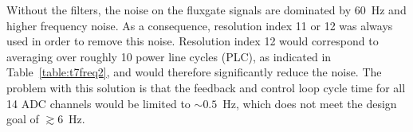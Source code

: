 

Without the filters, the noise on the fluxgate signals are dominated
by 60~Hz and higher frequency noise.  As a consequence, resolution
index 11 or 12 was always used in order to remove this noise.
Resolution index 12 would correspond to averaging over roughly 10
power line cycles (PLC), as indicated in Table~\ref{table:t7freq2},
and would therefore significantly reduce the noise.  The problem with
this solution is that the feedback and control loop cycle time for all
14 ADC channels would be limited to $\sim 0.5$~Hz, which does not meet
the design goal of $\gtrsim 6$~Hz.


